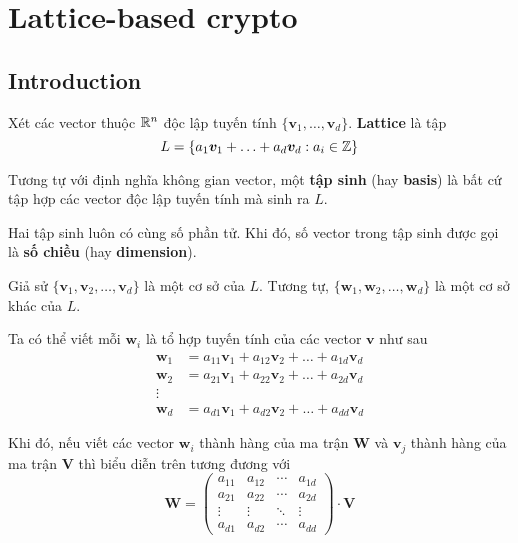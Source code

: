 \chapter*{Lattice-based crypto}

\section{Introduction}

\begin{definition}[Lattice]
    Xét các vector thuộc $\mathbb{R}^n$ độc lập tuyến tính $\{ \bm{v}_1, \ldots, \bm{v}_d \}$. \textbf{Lattice} là tập
    \begin{equation}
        L = \{ a_1 \bm{v}_1 + \ldots + a_d \bm{v}_d : a_i \in \mathbb{Z} \}
    \end{equation}
\end{definition}

Tương tự với định nghĩa không gian vector, một \textbf{tập sinh} (hay \textbf{basis}) là bất cứ tập hợp các vector độc lập tuyến tính mà sinh ra $L$.

Hai tập sinh luôn có cùng số phần tử. Khi đó, số vector trong tập sinh được gọi là \textbf{số chiều} (hay \textbf{dimension}).

Giả sử $\{ \bm{v}_1, \bm{v}_2, \ldots, \bm{v}_d \}$ là một cơ sở của $L$. Tương tự, $\{ \bm{w}_1, \bm{w}_2, \ldots, \bm{w}_d \}$ là một cơ sở khác của $L$.

Ta có thể viết mỗi $\bm{w}_i$ là tổ hợp tuyến tính của các vector $\bm{v}$ như sau
\begin{align*}
    \bm{w}_1 & = a_{11} \bm{v}_1 + a_{12} \bm{v}_2 + \ldots + a_{1d} \bm{v}_d \\
    \bm{w}_2 & = a_{21} \bm{v}_1 + a_{22} \bm{v}_2 + \ldots + a_{2d} \bm{v}_d \\
    \vdots & \\
    \bm{w}_d & = a_{d1} \bm{v}_1 + a_{d2} \bm{v}_2 + \ldots + a_{dd} \bm{v}_d
\end{align*}

Khi đó, nếu viết các vector $\bm{w}_i$ thành hàng của ma trận $\bm{W}$ và $\bm{v}_j$ thành hàng của ma trận $\bm{V}$ thì biểu diễn trên tương đương với
\begin{equation*}
    \bm{W} = \begin{pmatrix}
        a_{11} & a_{12} & \cdots & a_{1d} \\
        a_{21} & a_{22} & \cdots & a_{2d} \\
        \vdots & \vdots & \ddots & \vdots \\
        a_{d1} & a_{d2} & \cdots & a_{dd}
    \end{pmatrix} \cdot \bm{V}
\end{equation*}

